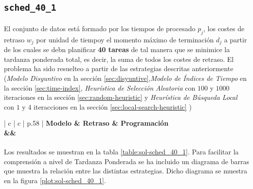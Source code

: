 \documentclass[spanish]{article}
\begin{document}
		\subsection{\texttt{sched\_40\_1}}

			\paragraph{}
			El conjunto de datos está formado por los tiempos de procesado $p_j$, los costes de retraso $w_j$ por unidad de tiempoy el momento máximo de terminación $d_j$ a partir de los cuales se debn planificar \textbf{40 tareas} de tal manera que se minimice la tardanza ponderada total, es decir, la suma de todos los costes de retraso. El problema ha sido resuelteo a partir de las estrategias descritas anteriormente (\emph{Modelo Disyuntivo} en la sección \ref{sec:disyuntive},\emph{Modelo de Índices de Tiempo} en la sección \ref{sec:time-index}, \emph{Heurística de Selección Aleatoria} con $100$ y $1000$ iteraciones en la sección \ref{sec:random-heuristic} y \emph{Heurística de Búsqueda Local} con $1$ y $4$ iteracciones en la sección \ref{sec:local-search-heuristic} )

			\begin{table}
				\centering
				\begin{tabu}{ | c | c | p{.58\linewidth} |}
					\hline
					\bfseries Modelo & \bfseries Retraso & \bfseries Programación
					{\\\hline\model&\delay&\schedule}
					\\\hline
				\end{tabu}
				\caption{Resultados Obtenidos para el problema \texttt{sched\_40\_1}}
				\label{table:sol-sched_40_1}
			\end{table}

			\paragraph{}
			Los resultados se muestran en la tabla \ref{table:sol-sched_40_1}. Para facilitar la comprensión a nivel de Tardanza Ponderada se ha incluido un diagrama de barras que muestra la relación entre las distintas estrategias. Dicho diagrama se muestra en la figura \ref{plot:sol-sched_40_1}.
\end{document}
